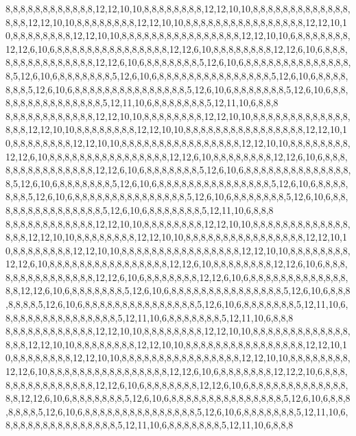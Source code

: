 8,8,8,8,8,8,8,8,8,8,8,8,12,12,10,10,8,8,8,8,8,8,8,8,12,12,10,10,8,8,8,8,8,8,8,8,8,8,8,8,8,8,8,8,12,12,10,10,8,8,8,8,8,8,8,8,12,12,10,10,8,8,8,8,8,8,8,8,8,8,8,8,8,8,8,8,12,12,10,10,8,8,8,8,8,8,8,8,12,12,10,10,8,8,8,8,8,8,8,8,8,8,8,8,8,8,8,8,12,12,10,10,6,8,8,8,8,8,8,8,12,12,6,10,6,8,8,8,8,8,8,8,8,8,8,8,8,8,8,8,12,12,6,10,8,8,8,8,8,8,8,8,12,12,6,10,6,8,8,8,8,8,8,8,8,8,8,8,8,8,8,8,12,12,6,10,6,8,8,8,8,8,8,8,5,12,6,10,6,8,8,8,8,8,8,8,8,8,8,8,8,8,8,8,5,12,6,10,6,8,8,8,8,8,8,8,5,12,6,10,6,8,8,8,8,8,8,8,8,8,8,8,8,8,8,8,5,12,6,10,6,8,8,8,8,8,8,8,5,12,6,10,6,8,8,8,8,8,8,8,8,8,8,8,8,8,8,8,5,12,6,10,6,8,8,8,8,8,8,8,5,12,6,10,6,8,8,8,8,8,8,8,8,8,8,8,8,8,8,8,5,12,11,10,6,8,8,8,8,8,8,8,5,12,11,10,6,8,8,8
8,8,8,8,8,8,8,8,8,8,8,8,12,12,10,10,8,8,8,8,8,8,8,8,12,12,10,10,8,8,8,8,8,8,8,8,8,8,8,8,8,8,8,8,12,12,10,10,8,8,8,8,8,8,8,8,12,12,10,10,8,8,8,8,8,8,8,8,8,8,8,8,8,8,8,8,12,12,10,10,8,8,8,8,8,8,8,8,12,12,10,10,8,8,8,8,8,8,8,8,8,8,8,8,8,8,8,8,12,12,10,10,8,8,8,8,8,8,8,8,12,12,6,10,8,8,8,8,8,8,8,8,8,8,8,8,8,8,8,8,12,12,6,10,8,8,8,8,8,8,8,8,12,12,6,10,6,8,8,8,8,8,8,8,8,8,8,8,8,8,8,8,12,12,6,10,6,8,8,8,8,8,8,8,5,12,6,10,6,8,8,8,8,8,8,8,8,8,8,8,8,8,8,8,5,12,6,10,6,8,8,8,8,8,8,8,5,12,6,10,6,8,8,8,8,8,8,8,8,8,8,8,8,8,8,8,5,12,6,10,6,8,8,8,8,8,8,8,5,12,6,10,6,8,8,8,8,8,8,8,8,8,8,8,8,8,8,8,5,12,6,10,6,8,8,8,8,8,8,8,5,12,6,10,6,8,8,8,8,8,8,8,8,8,8,8,8,8,8,8,5,12,6,10,6,8,8,8,8,8,8,8,5,12,11,10,6,8,8,8
8,8,8,8,8,8,8,8,8,8,8,8,12,12,10,10,8,8,8,8,8,8,8,8,12,12,10,10,8,8,8,8,8,8,8,8,8,8,8,8,8,8,8,8,12,12,10,10,8,8,8,8,8,8,8,8,12,12,10,10,8,8,8,8,8,8,8,8,8,8,8,8,8,8,8,8,12,12,10,10,8,8,8,8,8,8,8,8,12,12,10,10,8,8,8,8,8,8,8,8,8,8,8,8,8,8,8,8,12,12,10,10,8,8,8,8,8,8,8,8,12,12,6,10,8,8,8,8,8,8,8,8,8,8,8,8,8,8,8,8,12,12,6,10,8,8,8,8,8,8,8,8,12,12,6,10,6,8,8,8,8,8,8,8,8,8,8,8,8,8,8,8,12,12,6,10,6,8,8,8,8,8,8,8,12,12,6,10,6,8,8,8,8,8,8,8,8,8,8,8,8,8,8,8,12,12,6,10,6,8,8,8,8,8,8,8,5,12,6,10,6,8,8,8,8,8,8,8,8,8,8,8,8,8,8,8,5,12,6,10,6,8,8,8,8,8,8,8,5,12,6,10,6,8,8,8,8,8,8,8,8,8,8,8,8,8,8,8,5,12,6,10,6,8,8,8,8,8,8,8,5,12,11,10,6,8,8,8,8,8,8,8,8,8,8,8,8,8,8,8,5,12,11,10,6,8,8,8,8,8,8,8,5,12,11,10,6,8,8,8
8,8,8,8,8,8,8,8,8,8,8,8,12,12,10,10,8,8,8,8,8,8,8,8,12,12,10,10,8,8,8,8,8,8,8,8,8,8,8,8,8,8,8,8,12,12,10,10,8,8,8,8,8,8,8,8,12,12,10,10,8,8,8,8,8,8,8,8,8,8,8,8,8,8,8,8,12,12,10,10,8,8,8,8,8,8,8,8,12,12,10,10,8,8,8,8,8,8,8,8,8,8,8,8,8,8,8,8,12,12,10,10,8,8,8,8,8,8,8,8,12,12,6,10,8,8,8,8,8,8,8,8,8,8,8,8,8,8,8,8,12,12,6,10,6,8,8,8,8,8,8,8,12,12,2,10,6,8,8,8,8,8,8,8,8,8,8,8,8,8,8,8,12,12,6,10,6,8,8,8,8,8,8,8,12,12,6,10,6,8,8,8,8,8,8,8,8,8,8,8,8,8,8,8,12,12,6,10,6,8,8,8,8,8,8,8,5,12,6,10,6,8,8,8,8,8,8,8,8,8,8,8,8,8,8,8,5,12,6,10,6,8,8,8,8,8,8,8,5,12,6,10,6,8,8,8,8,8,8,8,8,8,8,8,8,8,8,8,5,12,6,10,6,8,8,8,8,8,8,8,5,12,11,10,6,8,8,8,8,8,8,8,8,8,8,8,8,8,8,8,5,12,11,10,6,8,8,8,8,8,8,8,5,12,11,10,6,8,8,8
